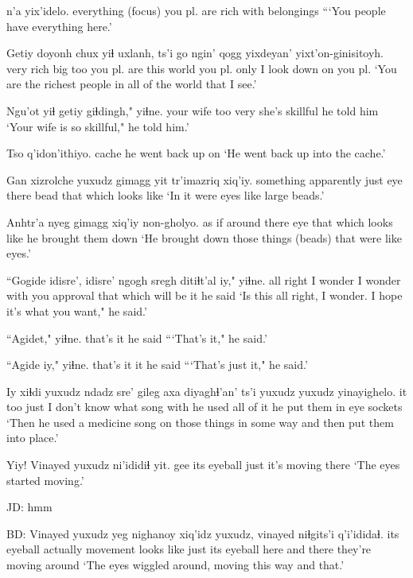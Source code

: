 \documentclass[12pt]{article}
\begin{document}
 n'a yix'idelo.
everything {(focus)} {you pl. are rich with belongings}
\glt  ```You people have everything here.'
\glend

\gll Getiy doyonh chux yiɬ uxlanh, ts'i go {ngin' qogg} yixdeyan' yixt'on-ginisitoyh.
very rich big too {you pl. are} {} this world {you pl. only} {I look down on you pl.}
\glt `You are the richest people in all of the world that I see.'
\glend

\gll Ngu'ot yiɬ getiy giɬdingh," yiɬne.
{your wife} too very {she's skillful} {he told him}
\glt `Your wife is so skillful," he told him.'
\glend

\gll Tso q'idon'ithiyo.
cache {he went back up on}
\glt `He went back up into the cache.'
\glend

\gll Gan xizrolche yuxudz gimagg yit tr'imazriq xiq'iy.
something apparently just eye there bead {that which looks like}
\glt `In it were eyes like large beads.'
\glend

\gll Anhtr'a nyeg gimagg xiq'iy non-gholyo.
{as if} {around there} eye {that which looks like} {he brought them down}
\glt `He brought down those things (beads) that were like eyes.'
\glend

\gll ``Gogide idisre', idisre' ngogh sregh ditiɬt'al iy," yiɬne.
{all right} {I wonder} {I wonder} {with you} {approval} {that which will be} it {he said}
\glt `Is this all right, I wonder. I hope it's what you want," he said.'
\glend

\gll ``Agidet," yiɬne.
{that's it} {he said}
\glt ```That's it," he said.'
\glend

\gll ``Agide iy," yiɬne.
{that's it} it {he said}
\glt ```That's just it," he said.'
\glend

\gll Iy xiɬdi yuxudz {ndadz sre'} gileg axa diyaghɬ'an' ts'i {yuxudz yuxudz} yinayighelo.
it too just {I don't know what} song with {he used} {} {all of it} {he put them in eye sockets}
\glt `Then he used a medicine song on those things in some way and then put them into place.'
\glend

\gll Yiy! Vinayed yuxudz ni'ididiɬ yit.
gee {its eyeball} just {it's moving} there
\glt `The eyes started moving.'
\glend

JD:  hmm

BD:
\gll Vinayed {yuxudz yeg} nighanoy xiq'idz yuxudz, vinayed niɬgits'i q'i'ididaɬ.
{its eyeball} actually movement {looks like} just {its eyeball} {here and there} {they're moving around}
\glt `The eyes wiggled around, moving this way and that.'
\glend
\end{document}
